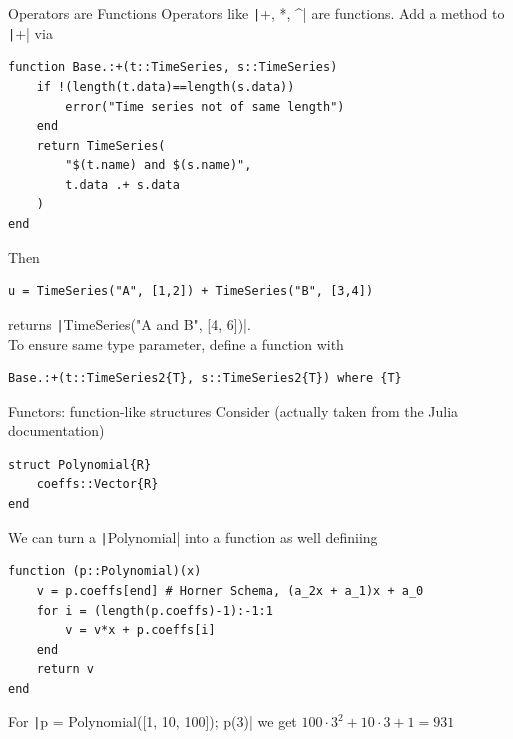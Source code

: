 \documentclass[aspectratio=169, 11pt, handout]{beamer}
\begin{document}
    \begin{frame}[fragile]{Operators are Functions}
        Operators like \texttt|+, *, ^| are \alert{functions}. Add a method to \texttt|+| via
        \begin{verbatim}
function Base.:+(t::TimeSeries, s::TimeSeries)
    if !(length(t.data)==length(s.data))
        error("Time series not of same length")
    end
    return TimeSeries(
        "$(t.name) and $(s.name)",
        t.data .+ s.data
    )
end
        \end{verbatim}
        \pause
        Then
        \begin{verbatim}
u = TimeSeries("A", [1,2]) + TimeSeries("B", [3,4])
        \end{verbatim}
        returns \texttt|TimeSeries("A and B", [4, 6])|.
        \\[.5\baselineskip]\pause
        To ensure same type parameter, define a function with
        \begin{verbatim}
Base.:+(t::TimeSeries2{T}, s::TimeSeries2{T}) where {T}
        \end{verbatim}
    \end{frame}
    \begin{frame}[fragile]{Functors: function-like structures}
    Consider (actually taken from the Julia documentation)
    \begin{verbatim}
struct Polynomial{R}
    coeffs::Vector{R}
end
    \end{verbatim}
    \pause
    We can turn a \texttt|Polynomial| into a function as well definiing
    \begin{verbatim}
function (p::Polynomial)(x)
    v = p.coeffs[end] # Horner Schema, (a_2x + a_1)x + a_0
    for i = (length(p.coeffs)-1):-1:1
        v = v*x + p.coeffs[i]
    end
    return v
end
    \end{verbatim}
    \pause
    For \texttt|p = Polynomial([1, 10, 100]); p(3)| we get $100\cdot3^2 + 10\cdot3 + 1 = 931$
    \end{frame}
\end{document}
